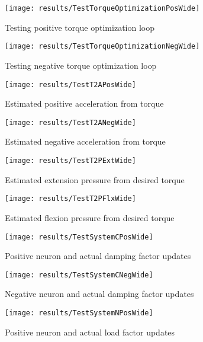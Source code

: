 \begin{figure}
\centering
\texttt{[image: results/TestTorqueOptimizationPosWide]}
\caption{Testing positive torque optimization loop}
\label{fig:TestTorqueOptimizationPos}
\end{figure}

\begin{figure}
\centering
\texttt{[image: results/TestTorqueOptimizationNegWide]}
\caption{Testing negative torque optimization loop}
\label{fig:TestTorqueOptimizationNeg}
\end{figure}

\begin{figure}
\centering
\texttt{[image: results/TestT2APosWide]}
\caption{Estimated positive acceleration from torque}
\label{fig:TestT2APos}
\end{figure}

\begin{figure}
\centering
\texttt{[image: results/TestT2ANegWide]}
\caption{Estimated negative acceleration from torque}
\label{fig:TestT2ANeg}
\end{figure}

\begin{figure}
\centering
\texttt{[image: results/TestT2PExtWide]}
\caption{Estimated extension pressure from desired torque}
\label{fig:TestT2PPos}
\end{figure}

\begin{figure}
\centering
\texttt{[image: results/TestT2PFlxWide]}
\caption{Estimated flexion pressure from desired torque}
\label{fig:TestT2PNeg}
\end{figure}

\begin{figure}
\centering
\texttt{[image: results/TestSystemCPosWide]}
\caption{Positive neuron and actual damping factor updates}
\label{fig:TestSystemCPos}
\end{figure}

\begin{figure}
\centering
\texttt{[image: results/TestSystemCNegWide]}
\caption{Negative neuron and actual damping factor updates}
\label{fig:TestSystemCNeg}
\end{figure}

\begin{figure}
\centering
\texttt{[image: results/TestSystemNPosWide]}
\caption{Positive neuron and actual load factor updates}
\label{fig:TestSystemNPos}
\end{figure}

